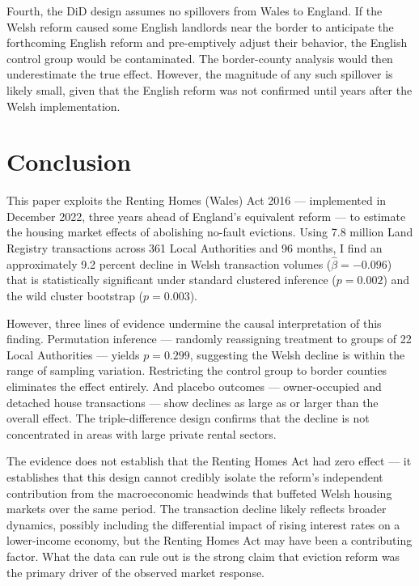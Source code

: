 \documentclass[12pt]{article}
\begin{document}
Fourth, the DiD design assumes no spillovers from Wales to England. If the Welsh reform caused some English landlords near the border to anticipate the forthcoming English reform and pre-emptively adjust their behavior, the English control group would be contaminated. The border-county analysis would then underestimate the true effect. However, the magnitude of any such spillover is likely small, given that the English reform was not confirmed until years after the Welsh implementation.


\section{Conclusion}
\label{sec:conclusion}

This paper exploits the Renting Homes (Wales) Act 2016 --- implemented in December 2022, three years ahead of England's equivalent reform --- to estimate the housing market effects of abolishing no-fault evictions. Using 7.8 million Land Registry transactions across 361 Local Authorities and 96 months, I find an approximately 9.2 percent decline in Welsh transaction volumes ($\hat{\beta} = -0.096$) that is statistically significant under standard clustered inference ($p = 0.002$) and the wild cluster bootstrap ($p = 0.003$).

However, three lines of evidence undermine the causal interpretation of this finding. Permutation inference --- randomly reassigning treatment to groups of 22 Local Authorities --- yields $p = 0.299$, suggesting the Welsh decline is within the range of sampling variation. Restricting the control group to border counties eliminates the effect entirely. And placebo outcomes --- owner-occupied and detached house transactions --- show declines as large as or larger than the overall effect. The triple-difference design confirms that the decline is not concentrated in areas with large private rental sectors.

The evidence does not establish that the Renting Homes Act had zero effect --- it establishes that this design cannot credibly isolate the reform's independent contribution from the macroeconomic headwinds that buffeted Welsh housing markets over the same period. The transaction decline likely reflects broader dynamics, possibly including the differential impact of rising interest rates on a lower-income economy, but the Renting Homes Act may have been a contributing factor. What the data can rule out is the strong claim that eviction reform was the primary driver of the observed market response.
\end{document}
